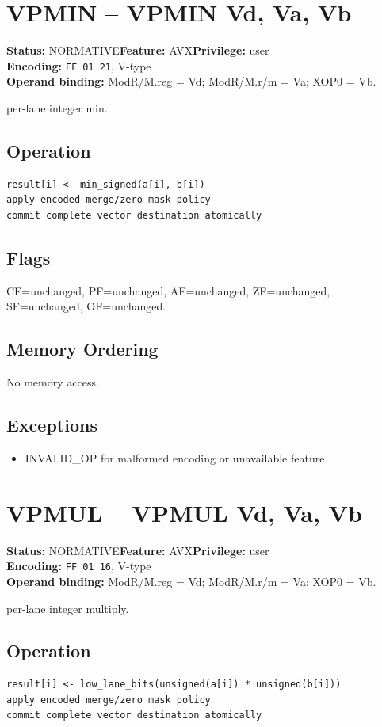 \documentclass[10pt]{article}
\begin{document}
\section{VPMIN -- VPMIN Vd, Va, Vb}
\textbf{Status:} NORMATIVE\quad \textbf{Feature:} AVX\quad \textbf{Privilege:} user\\
\textbf{Encoding:} \texttt{FF 01 21}, V-type\\
\textbf{Operand binding:} ModR/M.reg = Vd; ModR/M.r/m = Va; XOP0 = Vb.

per-lane integer min.

\subsection*{Operation}
\begin{lstlisting}
result[i] <- min_signed(a[i], b[i])
apply encoded merge/zero mask policy
commit complete vector destination atomically
\end{lstlisting}
\subsection*{Flags}
CF=unchanged, PF=unchanged, AF=unchanged, ZF=unchanged, SF=unchanged, OF=unchanged.
\subsection*{Memory Ordering}
No memory access.
\subsection*{Exceptions}
\begin{itemize}
\item INVALID\_OP for malformed encoding or unavailable feature
\end{itemize}
\clearpage

\section{VPMUL -- VPMUL Vd, Va, Vb}
\textbf{Status:} NORMATIVE\quad \textbf{Feature:} AVX\quad \textbf{Privilege:} user\\
\textbf{Encoding:} \texttt{FF 01 16}, V-type\\
\textbf{Operand binding:} ModR/M.reg = Vd; ModR/M.r/m = Va; XOP0 = Vb.

per-lane integer multiply.

\subsection*{Operation}
\begin{lstlisting}
result[i] <- low_lane_bits(unsigned(a[i]) * unsigned(b[i]))
apply encoded merge/zero mask policy
commit complete vector destination atomically
\end{lstlisting}
\end{document}
